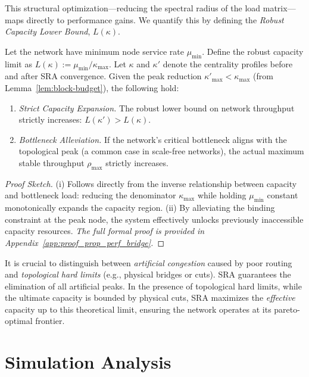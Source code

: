 \documentclass{ccjnl}
\begin{document}
This structural optimization---reducing the spectral radius of the load matrix---maps directly to performance gains. 
We quantify this by defining the \textit{Robust Capacity Lower Bound}, $L(\kappa)$.

\begin{proposition}
\label{prop:perf-bridge}
Let the network have minimum node service rate $\mu_{\min}$. Define the robust capacity limit as $L(\kappa):=\mu_{\min}/\kappa_{\max}$. 
Let $\kappa$ and $\kappa'$ denote the centrality profiles before and after SRA convergence.
Given the peak reduction $\kappa'_{\max} < \kappa_{\max}$ (from Lemma~\ref{lem:block-budget}), the following hold:
\begin{enumerate}[label=(\roman*)]
\item \emph{Strict Capacity Expansion.} The robust lower bound on network throughput strictly increases: $L(\kappa') > L(\kappa)$.
\item \emph{Bottleneck Alleviation.} If the network's critical bottleneck aligns with the topological peak (a common case in scale-free networks), the actual maximum stable throughput $\rho_{\max}$ strictly increases.
\end{enumerate}
\end{proposition}
\begin{proof}[Proof Sketch]
(i) Follows directly from the inverse relationship between capacity and bottleneck load: reducing the denominator $\kappa_{\max}$ while holding $\mu_{\min}$ constant monotonically expands the capacity region. (ii) By alleviating the binding constraint at the peak node, the system effectively unlocks previously inaccessible capacity resources. \textit{The full formal proof is provided in Appendix~\ref{app:proof_prop_perf_bridge}.}
\end{proof}

\begin{remark}
It is crucial to distinguish between \textit{artificial congestion} caused by poor routing and \textit{topological hard limits} (e.g., physical bridges or cuts). 
SRA guarantees the elimination of all artificial peaks. 
In the presence of topological hard limits, while the ultimate capacity is bounded by physical cuts, SRA maximizes the \textit{effective} capacity up to this theoretical limit, ensuring the network operates at its pareto-optimal frontier.
\end{remark}

\section{Simulation Analysis}
\label{sec:simulation}
\end{document}
